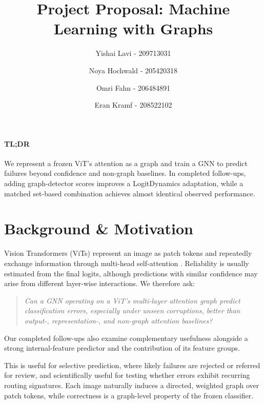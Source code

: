 

\title{Project Proposal: Machine Learning with Graphs}
\author{Yishai Lavi - 209713031}
\author{Noya Hochwald - 205420318}
\author{Omri Fahn - 206484891}
\author{Eran Kramf - 208522102}
\date{}


\maketitle

\paragraph{TL;DR}
We represent a frozen ViT's attention as a graph and train a GNN to
predict failures beyond confidence and non-graph baselines.
In completed follow-ups, adding graph-detector scores improves a
LogitDynamics adaptation, while a matched set-based combination achieves
almost identical observed performance.

\section{Background \& Motivation}

Vision Transformers (ViTs) represent an image as patch tokens and
repeatedly exchange information through multi-head self-attention
\citep{dosovitskiy2021image}. Reliability is
usually estimated from the final logits,
although predictions with similar confidence may arise from different
layer-wise interactions. We therefore ask:

\begin{quote}
\emph{Can a GNN operating on a ViT's multi-layer attention graph
predict classification errors, especially under unseen corruptions,
better than output-, representation-, and non-graph attention
baselines?}
\end{quote}

Our completed follow-ups also examine complementary usefulness alongside a
strong internal-feature predictor and the contribution of its feature groups.

This is useful for selective prediction, where likely failures are
rejected or referred for review, and scientifically useful for testing
whether errors exhibit recurring routing signatures. Each image
naturally induces a directed, weighted graph over patch tokens, while
correctness is a graph-level property of the frozen classifier.

